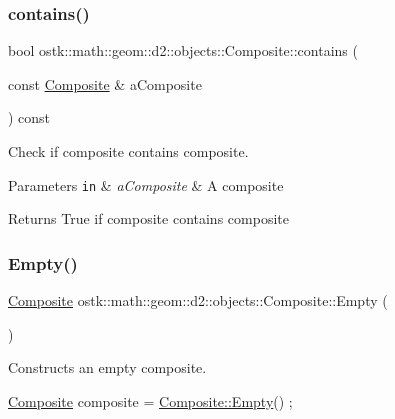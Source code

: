 \subsubsection{\texorpdfstring{contains()}{contains()}\hspace{0.1cm}{\footnotesize\ttfamily [2/2]}}
{\footnotesize\ttfamily bool ostk\+::math\+::geom\+::d2\+::objects\+::\+Composite\+::contains (\begin{DoxyParamCaption}\item[{const \hyperlink{classostk_1_1math_1_1geom_1_1d2_1_1objects_1_1_composite}{Composite} \&}]{a\+Composite }\end{DoxyParamCaption}) const}



Check if composite contains composite. 


\begin{DoxyParams}[1]{Parameters}
\mbox{\tt in}  & {\em a\+Composite} & A composite \\
\hline
\end{DoxyParams}
\begin{DoxyReturn}{Returns}
True if composite contains composite 
\end{DoxyReturn}
\mbox{\label{classostk_1_1math_1_1geom_1_1d2_1_1objects_1_1_composite_a2122fe1958355b07717a376d7778044f}} 
\subsubsection{\texorpdfstring{Empty()}{Empty()}}
{\footnotesize\ttfamily \hyperlink{classostk_1_1math_1_1geom_1_1d2_1_1objects_1_1_composite}{Composite} ostk\+::math\+::geom\+::d2\+::objects\+::\+Composite\+::\+Empty (\begin{DoxyParamCaption}{ }\end{DoxyParamCaption})\hspace{0.3cm}{\ttfamily [static]}}



Constructs an empty composite. 


\begin{DoxyCode}
\hyperlink{classostk_1_1math_1_1geom_1_1d2_1_1objects_1_1_composite_ad05d10b391609de957f14ab9db998991}{Composite} composite = \hyperlink{classostk_1_1math_1_1geom_1_1d2_1_1objects_1_1_composite_a2122fe1958355b07717a376d7778044f}{Composite::Empty}() ;
\end{DoxyCode}


